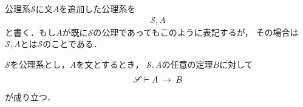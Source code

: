 	公理系$\mathscr{S}$に文$A$を追加した公理系を
	\begin{align}
		\mathscr{S}, A
	\end{align}
	と書く．もし$A$が既に$\mathscr{S}$の公理であってもこのように表記するが，
	その場合は$\mathscr{S}, A$とは$\mathscr{S}$のことである．
	
	\begin{screen}
		\begin{metathm}[演繹法則]
			$\mathscr{S}$を公理系とし，$A$を文とするとき，
			$\mathscr{S}, A$の任意の定理$B$に対して
			\begin{align}
				\mathscr{S} \vdash A \hspace{0.25em}\rightarrow\hspace{0.25em} B
			\end{align}
			が成り立つ．
		\end{metathm}
	\end{screen}
	
